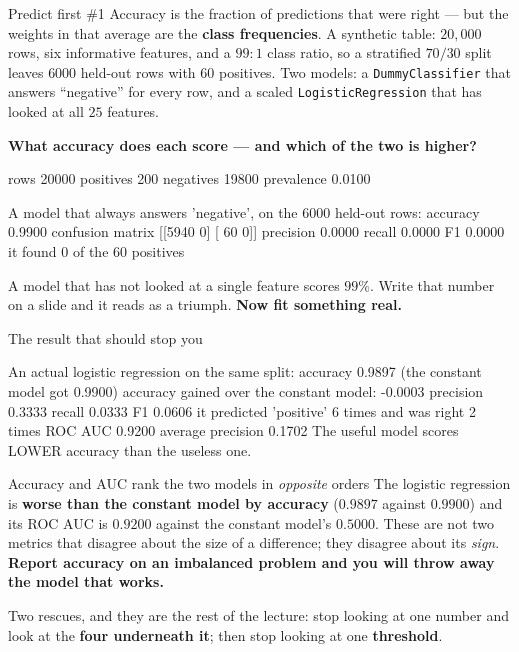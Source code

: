 \documentclass[aspectratio=169]{beamer}
\begin{document}
\begin{frame}[fragile,shrink=7]{Predict first \#1}
Accuracy is the fraction of predictions that were right --- but the weights in
that average are the \textbf{class frequencies}. A synthetic table: $20{,}000$
rows, six informative features, and a $99\!:\!1$ class ratio, so a stratified
$70/30$ split leaves $6000$ held-out rows with $60$ positives. Two models: a
\texttt{DummyClassifier} that answers ``negative'' for every row, and a scaled
\texttt{LogisticRegression} that has looked at all $25$ features.

\begin{center}
  \textbf{What accuracy does each score --- and which of the two is higher?}
\end{center}
\begin{outblk}
rows 20000   positives 200   negatives 19800   prevalence 0.0100

A model that always answers 'negative', on the 6000 held-out rows:
  accuracy  0.9900
  confusion matrix
[[5940    0]
 [  60    0]]
  precision 0.0000   recall 0.0000   F1 0.0000
  it found 0 of the 60 positives
\end{outblk}
\begin{center}\small
  A model that has not looked at a single feature scores $99\%$. Write that
  number on a slide and it reads as a triumph. \textbf{Now fit something
  real.}
\end{center}
\end{frame}

\begin{frame}[fragile,shrink=8]{The result that should stop you}
\begin{outblk}
An actual logistic regression on the same split:
  accuracy  0.9897  (the constant model got 0.9900)
  accuracy gained over the constant model: -0.0003
  precision 0.3333   recall 0.0333   F1 0.0606
  it predicted 'positive' 6 times and was right 2 times
  ROC AUC   0.9200   average precision 0.1702
The useful model scores LOWER accuracy than the useless one.
\end{outblk}
\begin{alertblock}{Accuracy and AUC rank the two models in \emph{opposite}
orders}
  \footnotesize The logistic regression is \textbf{worse than the constant
  model by accuracy} ($0.9897$ against $0.9900$) and its ROC AUC is
  $\mathbf{0.9200}$ against the constant model's $0.5000$. These are not two
  metrics that disagree about the size of a difference; they disagree about
  its \emph{sign}. \textbf{Report accuracy on an imbalanced problem and you
  will throw away the model that works.}
\end{alertblock}
\begin{center}\small
  Two rescues, and they are the rest of the lecture: stop looking at one
  number and look at the \textbf{four underneath it}; then stop looking at one
  \textbf{threshold}.
\end{center}
\end{frame}
\end{document}
